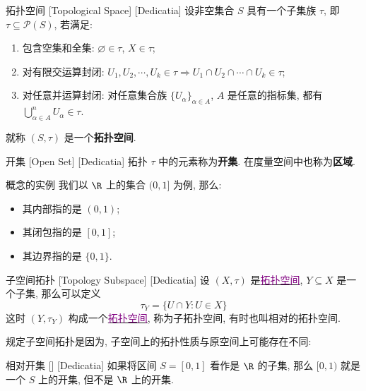 \documentclass[UTF8]{ctexart}
\newcommand{\hyperrefc}[2]{\hyperref[#1]{\textcolor{purple}{#2}}}
\begin{document}
\begin{dfn}
    [TopologicalSpace]
    {拓扑空间}
    [Topological Space]
    [Dedicatia]
    设非空集合 \( S \) 具有一个子集族 \( \tau \), 即 \( \tau\subseteq\mathcal{P}(S)  \), 若满足: 
    \begin{enumerate}
        \item 包含空集和全集:  \( \varnothing\in\tau \),  \( X\in\tau \);
        \item 对有限交运算封闭:  \( U_1,U_2,\cdots,U_k\in\tau\Longrightarrow U_1\cap U_2\cap\cdots\cap U_k\in\tau    \);
        \item 对任意并运算封闭: 对任意集合族 \( \{U_\alpha\}_{\alpha\in A} \),  \( A \) 是任意的指标集, 都有 \( \bigcup_{\alpha\in A}^n U_\alpha\in\tau \).
    \end{enumerate}
    就称 \( (S,\tau) \) 是一个\textbf{拓扑空间}. 
\end{dfn}
\begin{ppt}
    [UUID]
    {开集}
    [Open Set]
    [Dedicatia]
    拓扑 \( \tau \) 中的元素称为\textbf{开集}. 在度量空间中也称为\textbf{区域}. 
\end{ppt}
\begin{xmp}
    {概念的实例}
    我们以 \( \R \) 上的集合 \( (0,1] \) 为例, 那么: 
    \begin{itemize}
        \item 其内部指的是 \( (0,1) \);
        \item 其闭包指的是 \( [0,1] \);
        \item 其边界指的是 \( \{0,1\} \).
    \end{itemize}
\end{xmp}
\begin{dfn}
    [UUID]
    {子空间拓扑}
    [Topology Subspace]
    [Dedicatia]
    设 \( (X,\tau) \) 是\hyperrefc{dfn:TopologicalSpace}{拓扑空间},  \( Y\subseteq X \) 是一个子集, 那么可以定义
    \[\tau_Y=\{U\cap Y:U\in X\}\]
    这时 \( (Y,\tau_Y ) \) 构成一个\hyperrefc{dfn:TopologicalSpace}{拓扑空间}, 称为子拓扑空间, 有时也叫相对的拓扑空间. 
\end{dfn}
规定子空间拓扑是因为, 子空间上的拓扑性质与原空间上可能存在不同: 
\begin{xmp}
    [UUID]
    {相对开集}
    []
    [Dedicatia]
    如果将区间 \( S=[0,1] \) 看作是 \( \R \) 的子集, 那么 \( [0,1) \) 就是一个 \( S \) 上的开集, 但不是 \( \R \) 上的开集. 
\end{xmp}
\end{document}
